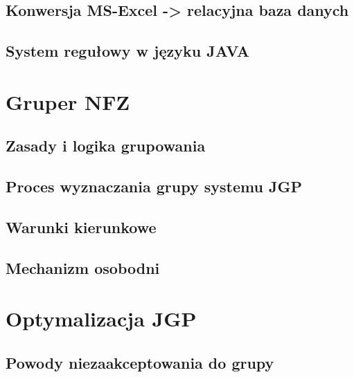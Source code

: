 \subsection{Konwersja MS-Excel -> relacyjna baza danych}
\label{sec:konwersjaExcelDB}

\subsection{System regułowy w języku JAVA}
\label{sec:systemRegulowyJAVA}

\section{Gruper NFZ}
\label{sec:gruperNFZ}

\subsection{Zasady i logika grupowania}
\label{sec:zasadyLogikaGrupowania}

\subsection{Proces wyznaczania grupy systemu JGP}
\label{sec:procesWyznaczaniaGrupySystemuJGP}

\subsection{Warunki kierunkowe}
\label{sec:warunkiKierunkowe}

\subsection{Mechanizm osobodni}
\label{sec:mechanizmOsobodni}

\section{Optymalizacja JGP}
\label{sec:optymalizacjaJGP}

\subsection{Powody niezaakceptowania do grupy}
\label{sec:powodyNiezaakceptowaniaDoGrupy}
